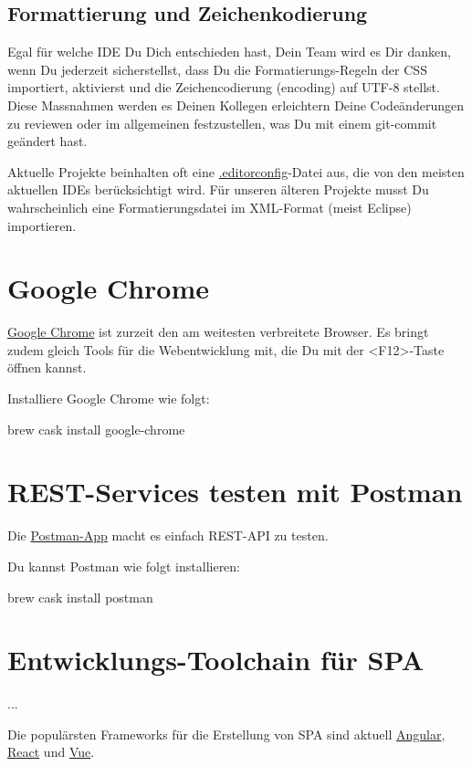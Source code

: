 \documentclass[]{article}
\begin{document}
\subsection{Formattierung und Zeichenkodierung }
Egal für welche IDE Du Dich entschieden hast, Dein Team wird es Dir danken, wenn Du jederzeit sicherstellst, dass Du die Formatierungs-Regeln der CSS importiert, aktivierst und die Zeichencodierung (encoding) auf UTF-8 stellst. Diese Massnahmen werden es Deinen Kollegen erleichtern Deine Codeänderungen zu reviewen oder im allgemeinen festzustellen, was Du mit einem git-commit geändert hast.

Aktuelle Projekte beinhalten oft eine \href{https://editorconfig.org/}{.editorconfig}-Datei aus, die von den meisten aktuellen IDEs berücksichtigt wird. Für unseren älteren Projekte musst Du wahrscheinlich eine Formatierungsdatei im XML-Format (meist Eclipse) importieren.

\section{Google Chrome}
\href{https://www.google.com/chrome/}{Google Chrome} ist zurzeit den am weitesten verbreitete Browser. Es bringt zudem gleich Tools für die Webentwicklung mit, die Du mit der <F12>-Taste öffnen kannst.

Installiere Google Chrome wie folgt:
\begin{bashcode}
brew cask install google-chrome
\end{bashcode}


\section{REST-Services testen mit Postman}
Die \href{https://www.getpostman.com/products}{Postman-App} macht es einfach REST-API zu testen. 

Du kannst Postman wie folgt installieren:
\begin{bashcode}
brew cask install postman
\end{bashcode}

\section{Entwicklungs-Toolchain für SPA}
...

Die populärsten Frameworks für die Erstellung von SPA sind aktuell \href{https://angular.io/}{Angular}, \href{https://reactjs.org/}{React} und \href{https://vuejs.org/}{Vue}.
\end{document}
